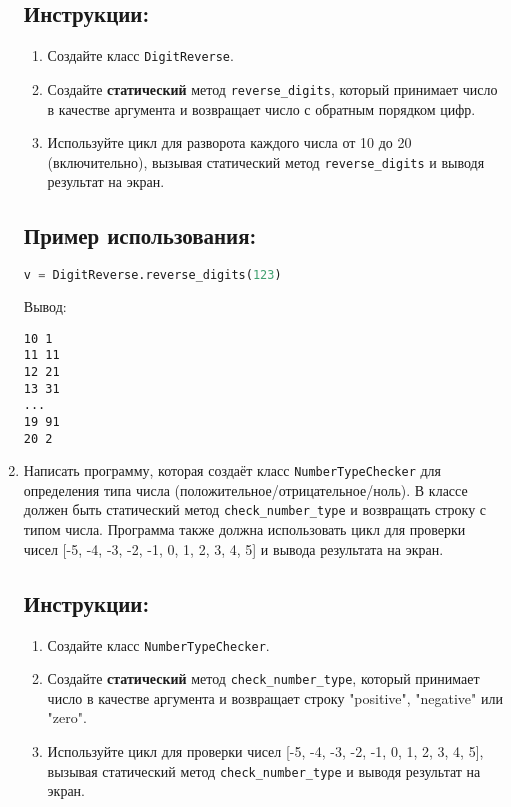 \begin{enumerate}
\subsection*{Инструкции:}
\begin{enumerate}
    \item Создайте класс \texttt{DigitReverse}.
    \item Создайте \textbf{статический} метод \texttt{reverse\_digits}, который принимает число в качестве аргумента и возвращает число с обратным порядком цифр.
    \item Используйте цикл для разворота каждого числа от 10 до 20 (включительно), вызывая статический метод \texttt{reverse\_digits} и выводя результат на экран.
\end{enumerate}

\subsection*{Пример использования:}
\begin{lstlisting}[language=Python]
    v = DigitReverse.reverse_digits(123)
\end{lstlisting}
Вывод:
\begin{verbatim}
10 1
11 11
12 21
13 31
...
19 91
20 2
\end{verbatim}

\item
Написать программу, которая создаёт класс \texttt{NumberTypeChecker} 
для определения типа числа (положительное/отрицательное/ноль). В классе должен быть статический метод
\texttt{check\_number\_type} и возвращать строку с типом числа. 
Программа также должна использовать цикл для проверки чисел 
[-5, -4, -3, -2, -1, 0, 1, 2, 3, 4, 5] и вывода результата на экран.

\subsection*{Инструкции:}
\begin{enumerate}
    \item Создайте класс \texttt{NumberTypeChecker}.
    \item Создайте \textbf{статический} метод \texttt{check\_number\_type}, который принимает число в качестве аргумента и возвращает строку "positive", "negative" или "zero".
    \item Используйте цикл для проверки чисел [-5, -4, -3, -2, -1, 0, 1, 2, 3, 4, 5], вызывая статический метод \texttt{check\_number\_type} и выводя результат на экран.
\end{enumerate}


\end{enumerate}
